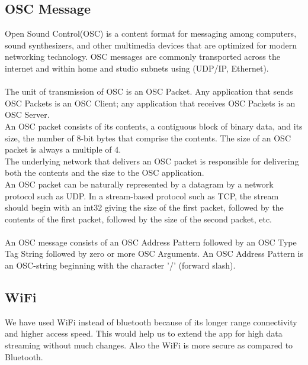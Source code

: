 \documentclass[10pt,conference,letterpaper]{IEEEtran}
\begin{document}
\subsection{OSC Message}
Open Sound Control(OSC) is a content format for messaging among computers, sound synthesizers, and other multimedia devices that are optimized for modern networking technology. OSC messages are commonly transported across the internet and within home and studio subnets using (UDP/IP, Ethernet).\\\\
The unit of transmission of OSC is an OSC Packet. Any application that sends OSC Packets is an OSC Client; any application that receives OSC Packets is an OSC Server.\\
An OSC packet consists of its contents, a contiguous block of binary data, and its size, the number of 8-bit bytes that comprise the contents. The size of an OSC packet is always a multiple of 4.\\
The underlying network that delivers an OSC packet is responsible for delivering both the contents and the size to the OSC application. \\
An OSC packet can be naturally represented by a datagram by a network protocol such as UDP. In a stream-based protocol such as TCP, the stream should begin with an int32 giving the size of the first packet, followed by the contents of the first packet, followed by the size of the second packet, etc.\\\\
An OSC message consists of an OSC Address Pattern followed by an OSC Type Tag String followed by zero or more OSC Arguments. An OSC Address Pattern is an OSC-string beginning with the character '/' (forward slash).

\subsection{WiFi}
We have used WiFi instead of bluetooth because of its longer range connectivity and higher access speed. This would help us to extend the app for high data streaming without much changes. Also the WiFi is more secure as compared to Bluetooth.
\end{document}

